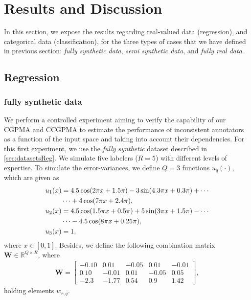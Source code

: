 \documentclass[journal]{IEEEtran}
\newcommand{\Real}{\mathbb{R}}
\newcommand{\boldW}{\mathbf{W}}
\begin{document}
\section{Results and Discussion}
In this section, we expose the results regarding real-valued data (regression), and categorical data (classification), for the three types of cases that we have defined in previous section: \textit{fully synthetic data}, \textit{semi synthetic data}, and \textit{fully real data}.

\subsection{Regression}
\subsubsection{fully synthetic data}
We perform a controlled experiment aiming to verify the capability of our CGPMA and CCGPMA to estimate the performance of inconsistent annotators as a function of the input space and taking into account their dependencies. For this first experiment, we use the \textit{fully synthetic} dataset described in \cref{sec:datasetsReg}. We simulate five labelers ($R=5$) with different levels of expertise. To simulate the error-variances, we define $Q=3$ functions $u_q(\cdot)$, which are given as 
\begin{align}
\label{eq:u1r}
\notag u_1(x) &= 4.5\cos(2\pi x + 1.5\pi) - 3\sin(4.3\pi x + 0.3\pi) +\cdots\\ & \cdots + 4\cos(7\pi x + 2.4\pi),\\
\label{eq:u2r}
\notag u_2(x) &= 4.5\cos(1.5\pi x + 0.5\pi) + 5\sin(3\pi x + 1.5\pi) - \cdots\\ & \cdots - 4.5\cos(8\pi x+ 0.25\pi),\\
\label{eq:u3r}
u_3(x) &= 1,
\end{align}
where $x\in [0,1]$. Besides, we define the following combination matrix $\boldW \in \Real^{Q\times R}$, where
\begin{align}
\boldW=\begin{bmatrix}
-0.10  &  0.01   & -0.05 &  0.01  & -0.01\\
0.10   &  -0.01  & 0.01  &  -0.05 & 0.05\\
-2.3   &  -1.77  & 0.54  &  0.9   & 1.42
\end{bmatrix},
\label{eq:parametersP}
\end{align}
holding elements $w_{r,q}$.
\end{document}

